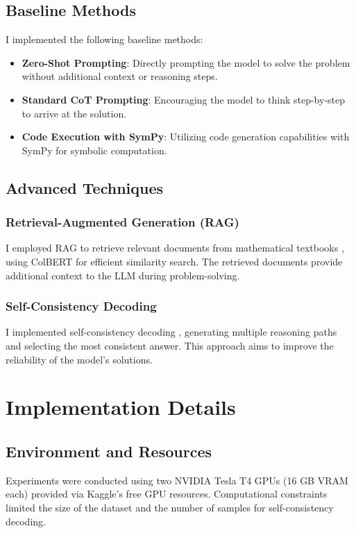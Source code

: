 \documentclass[11pt,a4paper]{article}
\begin{document}
\subsection{Baseline Methods}
I implemented the following baseline methods:
\begin{itemize}[noitemsep,nolistsep]
    \item \textbf{Zero-Shot Prompting}: Directly prompting the model to solve the problem without additional context or reasoning steps.
    \item \textbf{Standard CoT Prompting}: Encouraging the model to think step-by-step to arrive at the solution.
    \item \textbf{Code Execution with SymPy}: Utilizing code generation capabilities with SymPy for symbolic computation.
\end{itemize}

\subsection{Advanced Techniques}
\subsubsection{Retrieval-Augmented Generation (RAG)}
I employed RAG to retrieve relevant documents from mathematical textbooks \cite{wentingzhao2023mathtextbooks}, using ColBERT \cite{khattab2020colbert} for efficient similarity search. The retrieved documents provide additional context to the LLM during problem-solving.

\subsubsection{Self-Consistency Decoding}
I implemented self-consistency decoding \cite{wang2023selfconsistencyimproveschainthought}, generating multiple reasoning paths and selecting the most consistent answer. This approach aims to improve the reliability of the model's solutions.

\section{Implementation Details}
\subsection{Environment and Resources}
Experiments were conducted using two NVIDIA Tesla T4 GPUs (16 GB VRAM each) provided via Kaggle's free GPU resources. Computational constraints limited the size of the dataset and the number of samples for self-consistency decoding.
\end{document}
